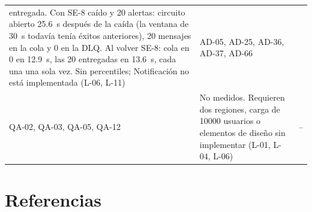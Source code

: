 \documentclass[11pt,letterpaper]{article}
\begin{document}
\begin{longtable}{L{1.9cm} L{9.1cm} L{4.8cm}}
entregada. Con SE-8 caído y 20 alertas: circuito abierto \qty{25,6}{\second} después de la caída (la
ventana de \qty{30}{\second} todavía tenía éxitos anteriores), 20 mensajes en la cola y 0 en la DLQ.
Al volver SE-8: cola en 0 en \qty{12,9}{\second}, las 20 entregadas en \qty{13,6}{\second}, cada una
una sola vez. Sin percentiles; Notificación no está implementada (L-06, L-11) & AD-05, AD-25, AD-36,
AD-37, AD-66 \\
QA-02, QA-03, QA-05, QA-12 & No medidos. Requieren dos regiones, carga de
\num{10000} usuarios o elementos de diseño sin implementar (L-01, L-04, L-06) & -- \\
\end{longtable}

\section{Referencias}
\label{sec:referencias}
\end{document}

